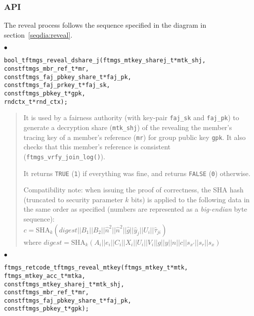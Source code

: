 \documentclass[a4paper]{article}
\newenvironment{api}%
{\noindent$\bullet$\hfill\begin{minipage}[t]{0.97\linewidth}\footnotesize\begin{alltt}}%
{\end{alltt}\end{minipage}}%
\begin{document}
\subsubsection*{API}
The reveal process follows the sequence specified in the diagram in
section~\ref{seqdia:reveal}.

\begin{api}
bool_t ftmgs_reveal_dshare_j(ftmgs_mtkey_sharej_t* mtk_shj,
                             const ftmgs_mbr_ref_t* mr,
                             const ftmgs_faj_pbkey_share_t* faj_pk,
                             const ftmgs_faj_prkey_t* faj_sk,
                             const ftmgs_pbkey_t* gpk,
                             rndctx_t* rnd_ctx);
\end{api}
\begin{quote}\footnotesize
It is used by a fairness authority (with key-pair \verb|faj_sk| and
\verb|faj_pk|) to generate a decryption share (\verb|mtk_shj|) of the
revealing the member's tracing key of a member's reference (\verb|mr|)
for group public key \verb|gpk|. It also checks that this member's
reference is consistent (\verb|ftmgs_vrfy_join_log()|).

It returns \verb|TRUE| (\verb|1|) if everything was fine, and returns
\verb|FALSE| (\verb|0|) otherwise.

Compatibility note: when issuing the proof of correctness, the SHA hash
(truncated to security parameter $k$ bits) is applied to the following
data in the same order as specified (numbers are represented as a
\emph{big-endian} byte sequence):\\ {$c =
  \mathrm{SHA}_k(\mathit{digest}||B_1||B_2||\hat{n}^2||\hat{n}^2||\hat{g}||\hat{y}_j||U_i||\hat{\tau}_{ji})$}
\\ where 
$\mathit{digest} = \mathrm{SHA}_k(A_i||e_i||C_i||X_i||U_i||V_i||g||y||n||c||s_{x'}||s_r||s_x)$
\end{quote}
\begin{api}
ftmgs_retcode_t ftmgs_reveal_mtkey(ftmgs_mtkey_t* mtk,
                                   ftmgs_mtkey_acc_t* mtka,
                                   const ftmgs_mtkey_sharej_t* mtk_shj,
                                   const ftmgs_mbr_ref_t* mr,
                                   const ftmgs_faj_pbkey_share_t* faj_pk,
                                   const ftmgs_pbkey_t* gpk);
\end{api}
\end{document}
